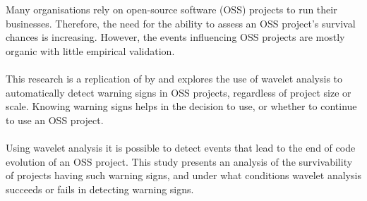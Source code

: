 Many organisations rely on open-source software (OSS) projects to run their
businesses. Therefore, the need for the ability to assess an OSS project's
survival chances is increasing. However, the events influencing OSS projects
are mostly organic with little empirical validation.

\paragraph{}
This research is a replication of \textit{\repltitle} by \replauthor{} and
explores the use of wavelet analysis to automatically detect warning signs in
OSS projects, regardless of project size or scale. Knowing warning signs helps
in the decision to use, or whether to continue to use an OSS project.

\paragraph{}
Using wavelet analysis it is possible to detect events that lead to the end of
code evolution of an OSS project. This study presents an analysis of the
survivability of projects having such warning signs, and under what conditions
wavelet analysis succeeds or fails in detecting warning signs.


\begin{comment}
1. State the problem.
2. State why the problem is a problem.
3. Startling.
4. State the implication of the startling.

See:
Ralph E. Johnson, Kent Beck, Grady Booch, William R. Cook, Richard P. Gabriel,
and Rebecca Wirfs-Brock.
How to Get a Paper Accepted at OOPSLA.
In Timlynn Babitsky and Jim Salmons, editors,
Proceedings of the Eighth Annual Conference on Object-Oriented Programming Systems, Languages and Applications, OOPSLA,
pages 429–436. ACM, 1993.
\end{comment}

